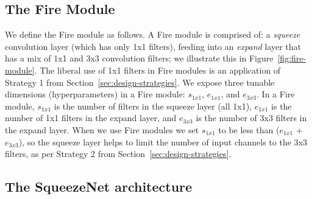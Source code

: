 \documentclass{article} %
\def\vsp{\vspace{-0.15in}}
\begin{document}


\subsection{The Fire Module}
\label{sec:fire-module}
\vsp

We define the Fire module as follows.
A Fire module is comprised of: a {\em squeeze} convolution layer (which has only 1x1 filters), feeding into an {\em expand} layer that has a mix of 1x1 and 3x3 convolution filters; we illustrate this in Figure~\ref{fig:fire-module}.
The liberal use of 1x1 filters in Fire modules is an application of Strategy 1 from Section~\ref{sec:design-strategies}.
We expose three tunable dimensions (hyperparameters) in a Fire module: $s_{1x1}$, $e_{1x1}$, and $e_{3x3}$.
In a Fire module, $s_{1x1}$ is the number of filters in the squeeze layer (all 1x1), $e_{1x1}$ is the number of 1x1 filters in the expand layer, and $e_{3x3}$ is the number of 3x3 filters in the expand layer.
When we use Fire modules we set $s_{1x1}$ to be less than ($e_{1x1}$ + $e_{3x3}$), so the squeeze layer helps to limit the number of input channels to the 3x3 filters, as  per Strategy 2 from Section~\ref{sec:design-strategies}.

\subsection{The SqueezeNet architecture}
\label{sec:squeezenet-arch}
\vsp
\end{document}
